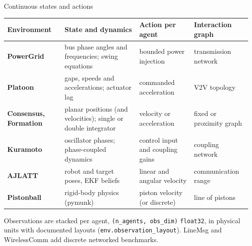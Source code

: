 \documentclass[10pt,aspectratio=169]{beamer}
\newcommand{\code}[1]{\texttt{#1}}
\newcommand{\muted}[1]{{\color{muted}#1}}
\begin{document}
\begin{frame}{Continuous states and actions}
  \scriptsize
  \renewcommand{\arraystretch}{1.35}
  \begin{tabularx}{\textwidth}{@{}l>{\raggedright\arraybackslash}X>{\raggedright\arraybackslash}p{3.7cm}l@{}}
    \toprule
    \textbf{Environment} & \textbf{State and dynamics} & \textbf{Action per agent} & \textbf{Interaction graph}\\
    \midrule
    \color{orange}\textbf{PowerGrid} & bus phase angles and frequencies; swing equations & bounded power injection & transmission network\\
    \color{pink}\textbf{Platoon} & gaps, speeds and accelerations; actuator lag & commanded acceleration & V2V topology\\
    \color{green}\textbf{Consensus, Formation} & planar positions (and velocities); single or double integrator & velocity or acceleration & fixed or proximity graph\\
    \color{accent}\textbf{Kuramoto} & oscillator phases; phase-coupled dynamics & control input and coupling gains & coupling network\\
    \color{purple}\textbf{AJLATT} & robot and target poses, EKF beliefs & linear and angular velocity & communication range\\
    \color{cyan}\textbf{Pistonball} & rigid-body physics (pymunk) & piston velocity (or discrete) & line of pistons\\
    \bottomrule
  \end{tabularx}

  \vspace{10pt}
  \footnotesize
  \muted{Observations are stacked per agent, \code{(n\_agents, obs\_dim)} \code{float32}, in physical units
  with documented layouts (\code{env.observation\_layout}). LineMsg and WirelessComm add discrete
  networked benchmarks.}
\end{frame}
\end{document}
